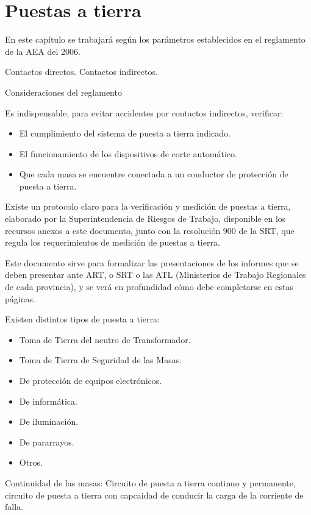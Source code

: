 
\chapter{Puestas a tierra}

En este capítulo se trabajará según los parámetros establecidos en el reglamento de la AEA del 2006.

Contactos directos.
Contactos indirectos.

Consideraciones del reglamento

Es indispensable, para evitar accidentes por contactos indirectos, verificar:
\begin{itemize}
	\item El cumplimiento del sistema de puesta a tierra indicado.
	\item El funcionamiento de los dispositivos de corte automático.
	\item Que cada masa se encuentre conectada a un conductor de protección de puesta a tierra.
\end{itemize}

Existe un protocolo claro para la verificación y medición de puestas a tierra, elaborado por la Superintendencia de Riesgos de Trabajo, disponible en los recursos anexos a este documento, junto con la resolución 900 de la SRT, que regula los requerimientos de medición de puestas a tierra.

Este documento sirve para formalizar las presentaciones de los informes que se deben presentar ante ART, o SRT o las ATL (Ministerios de Trabajo Regionales de cada provincia), y se verá en profundidad cómo debe completarse en estas páginas.

Existen distintos tipos de puesta a tierra:
\begin{itemize}
	\item Toma de Tierra del neutro de Transformador.
	\item Toma de Tierra de Seguridad de las Masas.
	\item De protección de equipos electrónicos.
	\item De informática.
	\item De iluminación.
	\item De pararrayos.
	\item Otros.
\end{itemize}

Continuidad de las masas: Circuito de puesta a tierra continuo y permanente, circuito de puesta a tierra con capcaidad de conducir la carga de la corriente de falla.

